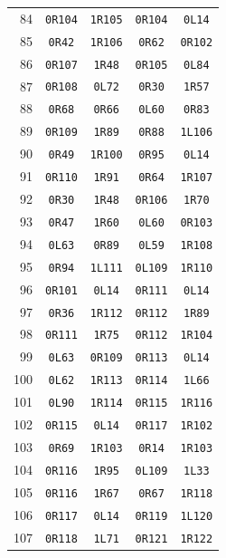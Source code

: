 \begin{longtable}{rcccc}
84 & \texttt{0R104} & \texttt{1R105} & \texttt{0R104} & \texttt{0L14} \\
85 & \texttt{0R42} & \texttt{1R106} & \texttt{0R62} & \texttt{0R102} \\
86 & \texttt{0R107} & \texttt{1R48} & \texttt{0R105} & \texttt{0L84} \\
87 & \texttt{0R108} & \texttt{0L72} & \texttt{0R30} & \texttt{1R57} \\
88 & \texttt{0R68} & \texttt{0R66} & \texttt{0L60} & \texttt{0R83} \\
89 & \texttt{0R109} & \texttt{1R89} & \texttt{0R88} & \texttt{1L106} \\
90 & \texttt{0R49} & \texttt{1R100} & \texttt{0R95} & \texttt{0L14} \\
91 & \texttt{0R110} & \texttt{1R91} & \texttt{0R64} & \texttt{1R107} \\
92 & \texttt{0R30} & \texttt{1R48} & \texttt{0R106} & \texttt{1R70} \\
93 & \texttt{0R47} & \texttt{1R60} & \texttt{0L60} & \texttt{0R103} \\
94 & \texttt{0L63} & \texttt{0R89} & \texttt{0L59} & \texttt{1R108} \\
95 & \texttt{0R94} & \texttt{1L111} & \texttt{0L109} & \texttt{1R110} \\
96 & \texttt{0R101} & \texttt{0L14} & \texttt{0R111} & \texttt{0L14} \\
97 & \texttt{0R36} & \texttt{1R112} & \texttt{0R112} & \texttt{1R89} \\
98 & \texttt{0R111} & \texttt{1R75} & \texttt{0R112} & \texttt{1R104} \\
99 & \texttt{0L63} & \texttt{0R109} & \texttt{0R113} & \texttt{0L14} \\
100 & \texttt{0L62} & \texttt{1R113} & \texttt{0R114} & \texttt{1L66} \\
101 & \texttt{0L90} & \texttt{1R114} & \texttt{0R115} & \texttt{1R116} \\
102 & \texttt{0R115} & \texttt{0L14} & \texttt{0R117} & \texttt{1R102} \\
103 & \texttt{0R69} & \texttt{1R103} & \texttt{0R14} & \texttt{1R103} \\
104 & \texttt{0R116} & \texttt{1R95} & \texttt{0L109} & \texttt{1L33} \\
105 & \texttt{0R116} & \texttt{1R67} & \texttt{0R67} & \texttt{1R118} \\
106 & \texttt{0R117} & \texttt{0L14} & \texttt{0R119} & \texttt{1L120} \\
107 & \texttt{0R118} & \texttt{1L71} & \texttt{0R121} & \texttt{1R122} \\

\end{longtable}

